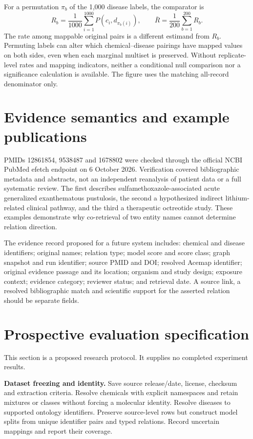 For a permutation $\pi_b$ of the 1,000 disease labels, the comparator is
\[
 R_b=\frac{1}{1000}\sum_{i=1}^{1000}P(c_i,d_{\pi_b(i)}),\qquad \bar R=\frac{1}{200}\sum_{b=1}^{200}R_b.
\]
The rate among mappable original pairs is a different estimand from $R_b$. Permuting labels can alter which chemical--disease pairings have mapped values on both sides, even when each marginal multiset is preserved. Without replicate-level rates and mapping indicators, neither a conditional null comparison nor a significance calculation is available. The figure uses the matching all-record denominator only.

\section{Evidence semantics and example publications}
PMIDs 12861854, 9538487 and 1678802 were checked through the official NCBI PubMed efetch endpoint on 6 October 2026. Verification covered bibliographic metadata and abstracts, not an independent reanalysis of patient data or a full systematic review. The first describes sulfamethoxazole-associated acute generalized exanthematous pustulosis, the second a hypothesized indirect lithium-related clinical pathway, and the third a therapeutic octreotide study. These examples demonstrate why co-retrieval of two entity names cannot determine relation direction.

The evidence record proposed for a future system includes: chemical and disease identifiers; original names; relation type; model score and score class; graph snapshot and run identifier; source PMID and DOI; resolved Acemap identifier; original evidence passage and its location; organism and study design; exposure context; evidence category; reviewer status; and retrieval date. A source link, a resolved bibliographic match and scientific support for the asserted relation should be separate fields.

\section{Prospective evaluation specification}
This section is a proposed research protocol. It supplies no completed experiment results.

\textbf{Dataset freezing and identity.} Save source release/date, license, checksum and extraction criteria. Resolve chemicals with explicit namespaces and retain mixtures or classes without forcing a molecular identity. Resolve diseases to supported ontology identifiers. Preserve source-level rows but construct model splits from unique identifier pairs and typed relations. Record uncertain mappings and report their coverage.

